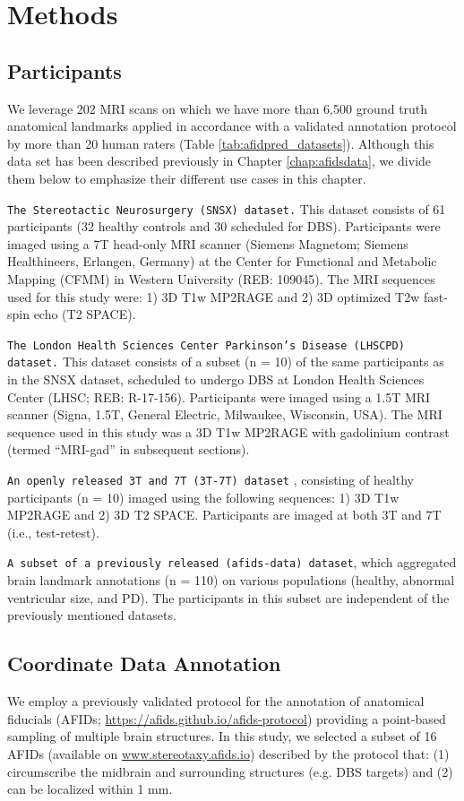 \section{Methods}

\subsection{Participants}
We leverage 202 MRI scans on which we have more than 6,500 ground truth anatomical landmarks applied in accordance with a validated annotation protocol \cite{Lau2019-eh} by more than 20 human raters (Table \ref{tab:afidpred_datasets}). Although this data set has been described previously in Chapter \ref{chap:afidsdata}, we divide them below to emphasize their different use cases in this chapter. 

\texttt{The Stereotactic Neurosurgery (SNSX) dataset.} This dataset consists of 61 participants (32 healthy controls and 30 scheduled for DBS). Participants were imaged using a 7T head-only MRI scanner (Siemens Magnetom; Siemens Healthineers, Erlangen, Germany) at the Center for Functional and Metabolic Mapping (CFMM) in Western University (REB: 109045). The MRI sequences used for this study were: 1) 3D T1w MP2RAGE and 2) 3D optimized T2w fast-spin echo (T2 SPACE).

\texttt{The London Health Sciences Center Parkinson’s Disease (LHSCPD) dataset.} This dataset consists of a subset (n = 10) of the same participants as in the SNSX dataset, scheduled to undergo DBS at London Health Sciences Center (LHSC; REB: R-17-156). Participants were imaged using a 1.5T MRI scanner (Signa, 1.5T, General Electric, Milwaukee, Wisconsin, USA). The MRI sequence used in this study was a 3D T1w MP2RAGE with gadolinium contrast (termed “MRI-gad” in subsequent sections).

\texttt{An openly released 3T and 7T (3T-7T) dataset} \cite{Chen2023-cn}, consisting of healthy participants (n = 10) imaged using the following sequences: 1) 3D T1w MP2RAGE and 2) 3D T2 SPACE. Participants are imaged at both 3T and 7T (i.e., test-retest).

\texttt{A subset of a previously released (afids-data) dataset}, which aggregated brain landmark annotations (n = 110) on various populations (healthy, abnormal ventricular size, and PD). The participants in this subset are independent of the previously mentioned datasets.

\subsection{Coordinate Data Annotation}
We employ a previously validated protocol for the annotation of anatomical fiducials (AFIDs; \url{https://afids.github.io/afids-protocol}) providing a point-based sampling of multiple brain structures. In this study, we selected a subset of 16 AFIDs (available on \url{www.stereotaxy.afids.io}) described by the protocol that: (1) circumscribe the midbrain and surrounding structures (e.g. DBS targets) and (2) can be localized within 1 mm.

